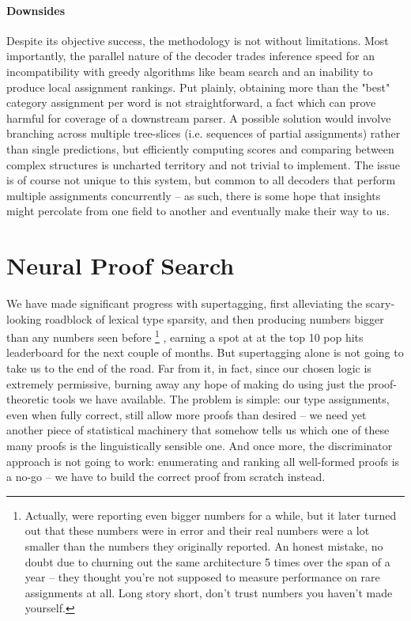 \paragraph{Downsides}
Despite its objective success, the methodology is not without limitations.
Most importantly, the parallel nature of the decoder trades inference speed for an incompatibility with greedy algorithms like beam search and an inability to produce local assignment rankings.
Put plainly, obtaining more than the "best" category assignment per word is not straightforward, a fact which can prove harmful for coverage of a downstream parser.
A possible solution would involve branching across multiple tree-slices (i.e. sequences of partial assignments) rather than single predictions, but efficiently computing scores and comparing between complex structures is uncharted territory and not trivial to implement.
The issue is of course not unique to this system, but common to all decoders that perform multiple assignments concurrently -- as such, there is some hope that insights might percolate from one field to another and eventually make their way to us.

\section{Neural Proof Search}
We have made significant progress with supertagging, first alleviating the scary-looking roadblock of lexical type sparsity, and then producing numbers bigger than any numbers seen before%
	\footnote{Actually, \citet{tian2020supertagging} were reporting even bigger numbers for a while, but it later turned out that these numbers were in error and their real numbers were a lot smaller than the numbers they originally reported.
	An honest mistake, no doubt due to churning out the same architecture 5 times over the span of a year -- they thought you're not supposed to measure performance on rare assignments at all.
	Long story short, don't trust numbers you haven't made yourself.}%
, earning a spot at at the top 10 pop hits leaderboard for the next couple of months.
But supertagging alone is not going to take us to the end of the road.
Far from it, in fact, since our chosen logic is extremely permissive, burning away any hope of making do using just the proof-theoretic tools we have available.
The problem is simple: our type assignments, even when fully correct, still allow more proofs than desired -- we need yet another piece of statistical machinery that somehow tells us which one of these many proofs is the linguistically sensible one.
And once more, the discriminator approach is not going to work: enumerating and ranking all well-formed proofs is a no-go -- we have to build the correct proof from scratch instead.

